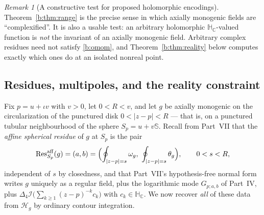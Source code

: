 \documentclass[11pt,a4paper]{article}
\numberwithin{equation}{section}
\theoremstyle{definition}
\theoremstyle{remark}
\newtheorem{remark}[theorem]{Remark}
\theoremstyle{plain}
\newcommand{\HC}{\mathbb H_{\mathbb C}}
\newcommand{\SSS}{\mathbb S}
\newcommand{\lap}{\Delta_4}
\newcommand{\I}{\mathcal I}
\newcommand{\om}{\omega}
\newcommand{\thet}{\theta}
\newcommand{\Sp}{S_{p}}
\newcommand{\Hg}{\mathcal H_{g}}      %
\newcommand{\abs}[1]{\lvert #1\rvert}
\newcommand{\Resaff}{\operatorname{Res}^{\mathrm{aff}}}
\begin{document}
\begin{remark}[A constructive test for proposed holomorphic encodings]
\label{b:rem:test}
Theorem~\ref{b:thm:range} is the precise sense in which axially monogenic
fields are ``complexified''.  It is also a usable test: an arbitrary
holomorphic $\HC$-valued function is \emph{not} the invariant of an axially
monogenic field.  Arbitrary complex residues need not satisfy \eqref{b:omom},
and Theorem~\ref{b:thm:reality} below computes exactly which ones do at an
isolated nonreal point.
\end{remark}

\subsection{Residues, multipoles, and the reality constraint}
\label{b:sub:residues}

Fix $p=u+\iota v$ with $v>0$, let $0<R<v$, and let $g$ be axially monogenic on
the circularization of the punctured disk $0<\abs{z-p}<R$ --- that is, on a
punctured tubular neighbourhood of the sphere $\Sp=u+v\SSS$.  Recall from
Part~VII that the \emph{affine spherical residue} of $g$ at $\Sp$ is the pair
\[
 \Resaff_{\Sp}(g)=(a,b)
 =\Bigl(\oint_{\abs{z-p}=s}\om_g,\ \oint_{\abs{z-p}=s}\thet_g\Bigr),
 \qquad 0<s<R,
\]
independent of $s$ by closedness, and that Part~VII's hypothesis-free
normal form writes $g$ uniquely as a regular field, plus the logarithmic mode
$G_{p;a,b}$ of Part~IV, plus $\lap\I\bigl(\sum_{k\ge1}(z-p)^{-k}c_k\bigr)$
with $c_k\in\HC$.  We now recover \emph{all} of these data from $\Hg$ by
ordinary contour integration.
\end{document}
